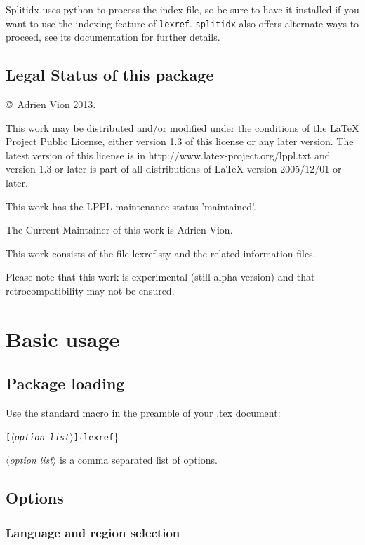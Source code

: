 \documentclass[a4paper]{ltxdockit}[2011/03/25]
\newcommand{\lexref}{\texttt{lexref}\xspace}
\newcommand{\marg}[1]{\{\texttt{#1}\}}
\newcommand{\oarg}[1]{\texttt{[#1]}}
\newcommand{\variable}[1]{$\langle$\textsl{#1}$\rangle$}
\begin{document}
Splitidx uses python to process the index file, so be sure to have it installed if you want to use the indexing feature of \lexref. \texttt{splitidx} also offers alternate ways to proceed, see its documentation for further details.

\subsection{Legal Status of this package}

\copyright~Adrien Vion 2013.

This work may be distributed and/or modified under the conditions of the LaTeX Project Public License, either version 1.3 of this license or any later version.
The latest version of this license is in http://www.latex-project.org/lppl.txt and version 1.3 or later is part of all distributions of LaTeX version 2005/12/01 or later.

This work has the LPPL maintenance status 'maintained'.

The Current Maintainer of this work is Adrien Vion.

This work consists of the file lexref.sty and the related information files.

Please note that this work is experimental (still alpha version) and that retrocompatibility may not be ensured.


\section{Basic usage}

\subsection{Package loading}

Use the standard macro in the preamble of your .tex document:

\oarg{\variable{option list}}\marg{lexref}

\variable{option list} is a comma separated list of options.

\subsection{Options}\label{options}

\subsubsection{Language and region selection}
\end{document}
